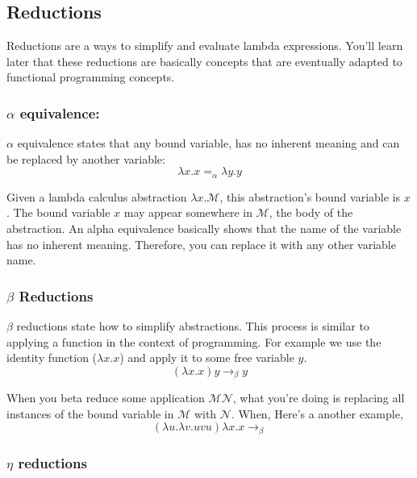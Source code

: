 \subsection{Reductions}\label{functional-programming-paradigm.md__reductions}

Reductions are a ways to simplify and evaluate lambda expressions.
You'll learn later that these reductions are basically concepts that are
eventually adapted to functional programming concepts.

\subsubsection{\texorpdfstring{\(\alpha\)
equivalence:}{\textbackslash alpha equivalence:}}\label{functional-programming-paradigm.md__alpha-equivalence}

\(\alpha\) equivalence states that any bound variable, has no inherent
meaning and can be replaced by another variable: \[
\lambda x.x =_\alpha \lambda y.y
\]

Given a lambda calculus abstraction \(\lambda x. \mathscr{M}\), this
abstraction's bound variable is \(x\). The bound variable \(x\) may
appear somewhere in \(\mathscr{M}\), the body of the abstraction. An
alpha equivalence basically shows that the name of the variable has no
inherent meaning. Therefore, you can replace it with any other variable
name.

\subsubsection{\texorpdfstring{\(\beta\)
Reductions}{\textbackslash beta Reductions}}\label{functional-programming-paradigm.md__beta-reductions}

\(\beta\) reductions state how to simplify abstractions. This process is
similar to applying a function in the context of programming. For
example we use the identity function (\(\lambda x.x\)) and apply it to
some free variable \(y\). \[
(\lambda x.x)y\to_\beta y
\]

When you beta reduce some application \(\mathscr{M}\mathscr{N}\), what
you're doing is replacing all instances of the bound variable in
\(\mathscr{M}\) with \(\mathscr{N}\). When, Here's a another example, \[
(\lambda u. \lambda v. uvu)\lambda x.x \to_{\beta} 
\]

\subsubsection{\texorpdfstring{\(\eta\)
reductions}{\textbackslash eta reductions}}\label{functional-programming-paradigm.md__eta-reductions}

